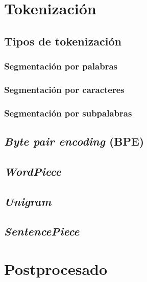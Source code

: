 \section{Tokenización}\label{tokenization}
\subsection{Tipos de tokenización}
\subsubsection{Segmentación por palabras}
\subsubsection{Segmentación por caracteres}
\subsubsection{Segmentación por subpalabras}
\subsection{\textit{Byte pair encoding} (BPE)}
\subsection{\textit{WordPiece}}
\subsection{\textit{Unigram}}
\subsection{\textit{SentencePiece}}
\section{Postprocesado}
